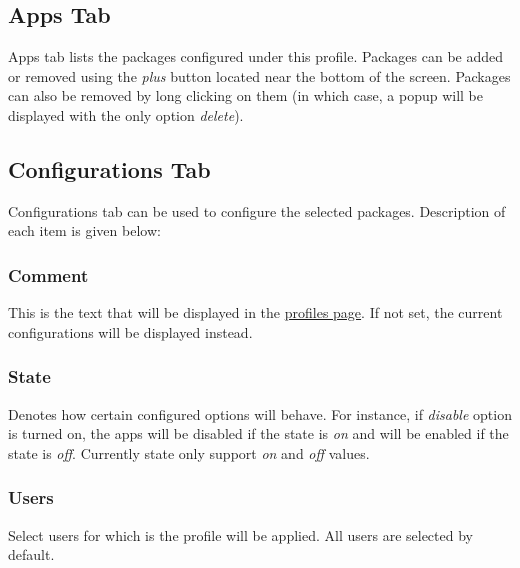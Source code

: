 \subsection{Apps Tab}\label{subsec:profile-apps-tab} %
Apps tab lists the packages configured under this profile. Packages can be added or removed using the \textit{plus}
button located near the bottom of the screen. Packages can also be removed by long clicking on them (in which case, a
popup will be displayed with the only option \textit{delete}).

\subsection{Configurations Tab}\label{subsec:profile-configurations-tab} %
Configurations tab can be used to configure the selected packages. Description of each item is given below:

\subsubsection{Comment} %
This is the text that will be displayed in the \hyperref[sec:profiles-page]{profiles page}. If not set, the current
configurations will be displayed instead.

\subsubsection{State}\label{subsubsec:profile-state} %
Denotes how certain configured options will behave. For instance, if \textit{disable} option is turned on, the apps will
be disabled if the state is \textit{on} and will be enabled if the state is \textit{off}. Currently state only support
\textit{on} and \textit{off} values.

\subsubsection{Users} %
Select users for which is the profile will be applied. All users are selected by default.


